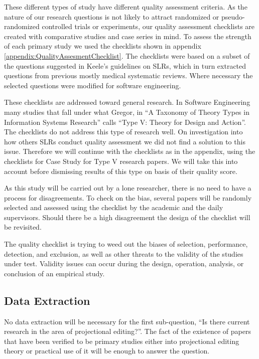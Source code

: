 These different types of study have different quality assessment criteria.
As the nature of our research questions is not likely to attract randomized or pseudo-randomized controlled trials or experiments, our quality assessment checklists are created with comparative studies and case series in mind.
To assess the strength of each primary study we used the checklists shown in appendix \ref{appendix:QualityAssesmentChecklist}.
The checklists were based on a subset of the questions suggested in Keele's guidelines on SLRs\cite{keele2007guidelines}, which in turn extracted questions from previous mostly medical systematic reviews.
Where necessary the selected questions were modified for software engineering.

These checklists are addressed toward general research.
In Software Engineering many studies that fall under what Gregor\cite{gregor2006nature}, in ``A Taxonomy of Theory Types in Information Systems Research'' calls ``Type V: Theory for Design and Action''.
The checklists do not address this type of research well.
On investigation into how others SLRs conduct quality assessment we did not find a solution to this issue.
Therefore we will continue with the checklists as in the appendix, using the checklists for Case Study for Type V research papers.
We will take this into account before dismissing results of this type on basis of their quality score.

As this study will be carried out by a lone researcher, there is no need to have a process for disagreements.
To check on the bias, several papers will be randomly selected and assessed using the checklist by the academic and the daily supervisors.
Should there be a high disagreement the design of the checklist will be revisited.

The quality checklist is trying to weed out the biases of selection, performance, detection, and exclusion, as well as other threats to the validity of the studies under test.
Validity issues can occur during the design, operation, analysis, or conclusion of an empirical study.

\subsection{Data Extraction}
No data extraction will be necessary for the first sub-question,  ``Is there current research in the area of projectional editing?''.
The fact of the existence of papers that have been verified to be primary studies either into projectional editing theory or practical use of it will be enough to answer the question.

